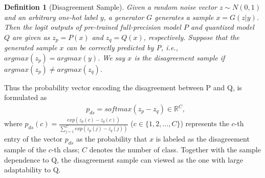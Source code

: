 \noindent \textbf{Definition 1} (Disagreement Sample). \emph{Given a random noise vector $z\sim N(0,1)$ and an arbitrary one-hot label $y$, a generator $G$ generates a sample $x=G(z|y)$. Then the logit outputs of pre-trained full-precision model $P$ and quantized model $Q$ are given as $z_p=P(x)$ and $z_q=Q(x)$, respectively. Suppose that the generated sample $x$ can be correctly predicted by P, i.e., $arg max(z_p)=arg max(y)$. We say $x$ is the disagreement sample if $arg max(z_p)\neq arg max(z_q)$.}

\noindent Thus  the probability vector encoding the disagreement between P and Q, is formulated as
\begin{equation}
\begin{aligned}
&p_{ds}=softmax(z_p- z_q) \in \mathbb{R}^C,
\end{aligned}
\label{dist_disagree}
\end{equation}
where $p_{ds}(c)=\frac{exp(z_p(c)-z_q(c))}{\sum_{j=1}^{C} exp(z_p(j)-z_q(j))}$ ($c\in\{1,2,...,C\}$) represents the $c$-th entry of the vector $p_{ds}$ as the probability that $x$ is labeled as the disagreement sample of the $c$-th class; $C$ denotes the number of class. Together with the sample dependence to Q, the disagreement sample can viewed as the one with large adaptability to Q.


